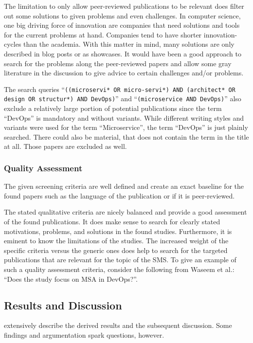 The limitation to only allow peer-reviewed publications
to be relevant does filter out some solutions to given problems and
even challenges. In computer science, one big driving force
of innovation are companies that need solutions and tools for the
current problems at hand. Companies tend to have shorter innovation-cycles
than the academia. With this matter in mind, many solutions are only described
in blog posts or as showcases. It would have been a good approach to search for the problems along
the peer-reviewed papers and allow some gray literature in the
discussion to give advice to certain challenges and/or problems.

The search queries
``\texttt{((microservi* OR micro-servi*) AND (architect* OR design OR structur*) AND DevOps)}''
and ``\texttt{(microservice AND DevOps)}'' \wsls
also exclude a relatively large portion of potential publications since 
the term ``DevOps'' is mandatory and without variants. While different
writing styles and variants were used for the term ``Microservice'', the term ``DevOps''
is just plainly searched. There could also be material, that does not
contain the term in the title at all. Those papers are excluded as well.

\subsubsection{Quality Assessment}

The given screening criteria are well defined and create
an exact baseline for the found papers such as the
language of the publication or if it is peer-reviewed.

The stated qualitative criteria are nicely balanced
and provide a good assessment of the found publications.
It does make sense to search for clearly stated motivations,
problems, and solutions in the found studies. Furthermore, it is
eminent to know the limitations of the studies. The increased
weight of the specific criteria versus the generic ones does
help to search for the targeted publications that are relevant
for the topic of the SMS. To give an example of such a quality
assessment criteria, consider the following from Waseem et al.:
``Does the study focus on MSA in DevOps?''.

\subsection{Results and Discussion}

\smsAuthors extensively describe the derived results and
the subsequent discussion. Some findings and argumentation
spark questions, however.

